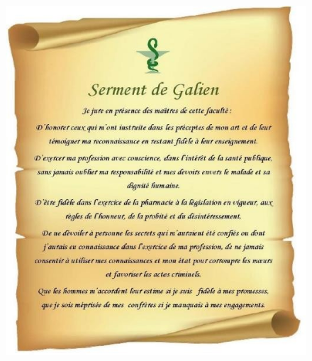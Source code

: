 \begin{figure}[H]
  \includegraphics[width=1.1\textwidth,height=1.4\textwidth]{Images/serment_galien_fr.jpg}
  
\end{figure}

\pagebreak


